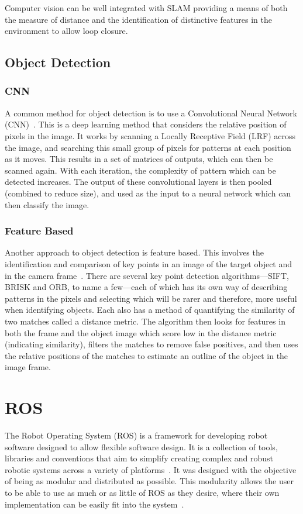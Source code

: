 Computer vision can be well integrated with SLAM providing a means of both the measure
of distance and the identification of distinctive
features in the environment to allow loop closure\cite{CVho2006loop}.

\subsection{Object Detection}\label{litreview/cv/objDet}
\subsubsection{CNN}\label{litreview/cv/objDet/CNN}
A common method for object detection is to use a Convolutional
Neural Network (CNN)~\cite{schmidhuber2015deep}. This is a deep learning method that
considers the relative position of pixels in the image. It
works by scanning a Locally Receptive Field (LRF) across the
image, and searching this small group of pixels for patterns
at each position as it moves. This results in a set of
matrices of outputs, which can then be scanned again. With
each iteration, the complexity of pattern which can be detected
increases. The output of these convolutional layers is then
pooled (combined to reduce size), and used as the input to a
neural network which can then classify the image.


\subsubsection{Feature Based}\label{litreview/cv/objDet/fb}
Another approach to object detection is feature based. This
involves the identification and comparison of key points in an
image of the target object and in the camera frame~\cite{lowe2004distinctive}. There are
several key point detection algorithms---SIFT, BRISK and ORB,
to name a few---each of which has its own way of describing
patterns in the pixels and selecting which will be rarer and
therefore, more useful when identifying objects. Each also has
a method of quantifying the similarity of two matches called a
distance metric. The algorithm then looks for features in both
the frame and the object image which score low in the distance
metric (indicating similarity), filters the matches to remove
false positives, and then uses the relative positions of the
matches to estimate an outline of the object in the image
frame.

\section{ROS}\label{litreview/ROS}
The Robot Operating System (ROS) is a framework for developing robot
software designed to allow flexible software design. It is a collection of tools,
libraries and conventions that aim to simplify creating complex and robust robotic systems across a variety of platforms~\cite{aboutROS}.
It was designed with the objective of being as modular and distributed
as possible. This modularity allows the user to be able to use as much or
as little of ROS as they desire, where their own implementation can be
easily fit into the system~\cite{rosForMe}.

